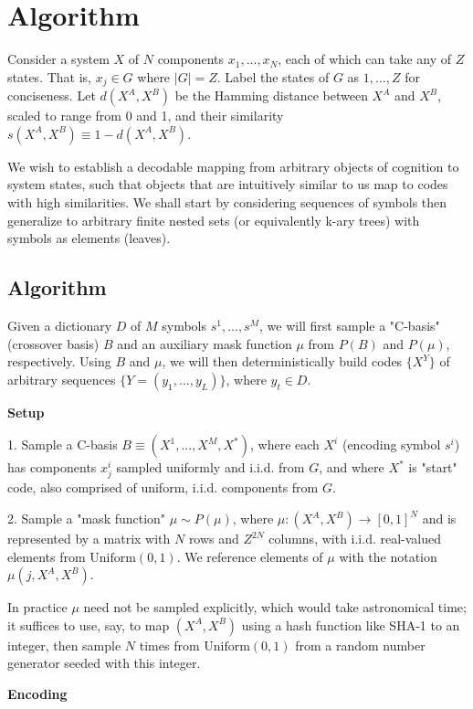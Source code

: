 \documentclass{article}
\begin{document}
\section{Algorithm}

Consider a system $X$ of $N$ components $x_1, ..., x_N$, each of which can take any of $Z$ states. That is, $x_j \in G$ where $|G| = Z$. Label the states of $G$ as $1,...,Z$ for conciseness. Let $d(X^A, X^B)$ be the Hamming distance between $X^A$ and $X^B$, scaled to range from 0 and 1, and their similarity $s(X^A, X^B) \equiv 1 - d(X^A, X^B)$.

We wish to establish a decodable mapping from arbitrary objects of cognition to system states, such that objects that are intuitively similar to us map to codes with high similarities. We shall start by considering sequences of symbols then generalize to arbitrary finite nested sets (or equivalently k-ary trees) with symbols as elements (leaves).

\subsection{Algorithm}

Given a dictionary $D$ of $M$ symbols $s^1, ..., s^M$, we will first sample a "C-basis" (crossover basis) $B$ and an auxiliary mask function $\mu$ from $P(B)$ and $P(\mu)$, respectively. Using $B$ and $\mu$, we will then deterministically build codes $\{X^Y\}$ of arbitrary sequences $\{Y = (y_1, ..., y_L)\}$, where $y_t \in D$.

\textbf{Setup}

1. Sample a C-basis $B \equiv (X^1, ..., X^M, X^*)$, where each $X^i$ (encoding symbol $s^i$) has components $x^i_j$ sampled uniformly and i.i.d. from $G$, and where $X^*$ is "start" code, also comprised of uniform, i.i.d. components from $G$.

2. Sample a "mask function" $\mu \sim P(\mu)$, where $\mu:(X^A, X^B) \rightarrow [0, 1]^N$ and is represented by a matrix with $N$ rows and $Z^{2N}$ columns, with i.i.d. real-valued elements from $\textrm{Uniform}(0, 1)$. We reference elements of $\mu$ with the notation $\mu(j, X^A, X^B)$.

In practice $\mu$ need not be sampled explicitly, which would take astronomical time; it suffices to use, say, to map $(X^A, X^B)$ using a hash function like SHA-1 to an integer, then sample $N$ times from $\textrm{Uniform}(0, 1)$ from a random number generator seeded with this integer.

\textbf{Encoding}
\end{document}
